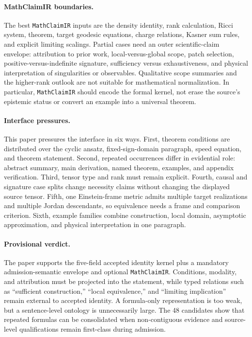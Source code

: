 \paragraph{MathClaimIR boundaries.}
The best \texttt{MathClaimIR} inputs are the density identity, rank calculation, Ricci system, theorem, target geodesic equations, charge relations, Kasner sum rules, and explicit limiting scalings. Partial cases need an outer scientific-claim envelope: attribution to prior work, local-versus-global scope, patch selection, positive-versus-indefinite signature, sufficiency versus exhaustiveness, and physical interpretation of singularities or observables. Qualitative scope summaries and the higher-rank outlook are not suitable for mathematical normalization. In particular, \texttt{MathClaimIR} should encode the formal kernel, not erase the source's epistemic status or convert an example into a universal theorem.

\paragraph{Interface pressures.}
This paper pressures the interface in six ways. First, theorem conditions are distributed over the cyclic ansatz, fixed-sign-domain paragraph, speed equation, and theorem statement. Second, repeated occurrences differ in evidential role: abstract summary, main derivation, named theorem, examples, and appendix verification. Third, tensor type and rank must remain explicit. Fourth, causal and signature case splits change necessity claims without changing the displayed source tensor. Fifth, one Einstein-frame metric admits multiple target realizations and multiple Jordan descendants, so equivalence needs a frame and comparison criterion. Sixth, example families combine construction, local domain, asymptotic approximation, and physical interpretation in one paragraph.

\paragraph{Provisional verdict.}
The paper supports the five-field accepted identity kernel plus a mandatory admission-semantic envelope and optional \texttt{MathClaimIR}. Conditions, modality, and attribution must be projected into the statement, while typed relations such as ``sufficient construction,'' ``local equivalence,'' and ``limiting implication'' remain external to accepted identity. A formula-only representation is too weak, but a sentence-level ontology is unnecessarily large. The 48 candidates show that repeated formulas can be consolidated when non-contiguous evidence and source-level qualifications remain first-class during admission.